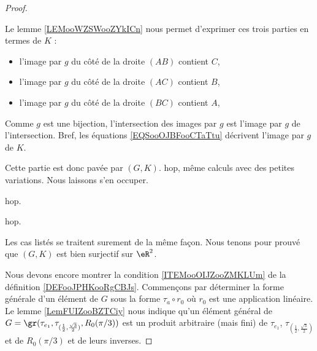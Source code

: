 \begin{proof}
\begin{subproof}
\begin{subproof}
\begin{subproof}
\begin{itemize}
				\end{itemize}
				Le lemme \ref{LEMooWZSWooZYkICn} nous permet d'exprimer ces trois parties en termes de \( K\) :
				\begin{itemize}
					\item l'image par \( g\) du côté de la droite \( (AB)\) contient \( C\),
					\item l'image par \( g\) du côté de la droite \( (AC)\) contient \( B\),
					\item l'image par \( g\) du côté de la droite \( (BC)\) contient \( A\),
				\end{itemize}
				Comme \( g\) est une bijection, l'intersection des images par \( g\) est l'image par \( g\) de l'intersection. Bref, les équations \eqref{EQSooOJBFooCTaTtu} décrivent l'image par \( g\) de \( K\).

				Cette partie est donc pavée par \( (G,K)\).
				hop, même calculs avec des petites variations. Nous laissons  s'en occuper.
			\end{subproof}

			hop.
		\end{subproof}
		hop.
	\end{subproof}
	Les cas listés se traitent surement de la même façon. Nous tenons pour prouvé que \( (G,K)\) est bien surjectif sur \( \eR^2\).

	Nous devons encore montrer la condition \ref{ITEMooOIJZooZMKLUm} de la définition \ref{DEFooJPHKooRgCBJs}. Commençons par déterminer la forme générale d'un élément de \( G\) sous la forme \( \tau_a\circ r_0\) où \( r_0\) est une application linéaire. Le lemme \ref{LemFUIZooBZTCiy} nous indique qu'un élément général de \( G=\gr(\tau_{e_1}, \tau_{(\frac{ 1 }{2},\frac{ \sqrt{ 3 } }{2})}, R_0(\pi/3))\) est un produit arbitraire (mais fini) de \( \tau_{e_1}\), \( \tau_{(\frac{ 1 }{2},\frac{ \sqrt{ 3 } }{2})}\) et de \( R_0(\pi/3)\) et de leurs inverses.


\end{proof}
